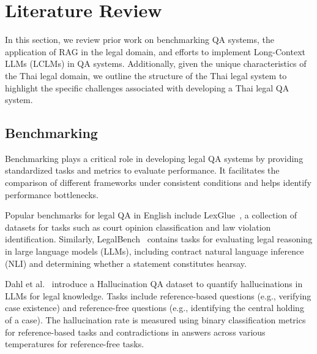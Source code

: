 \section{Literature Review}
\label{sec:lit_review}

In this section, we review prior work on benchmarking QA systems, the application of RAG in the legal domain, and efforts to implement Long-Context LLMs (LCLMs) in QA systems. 
%
Additionally, given the unique characteristics of the Thai legal domain, we outline the structure of the Thai legal system to highlight the specific challenges associated with developing a Thai legal QA system.

\subsection{Benchmarking}
\label{subsec: benchmarking}

Benchmarking plays a critical role in developing legal QA systems by providing standardized tasks and metrics to evaluate performance. 
%
It facilitates the comparison of different frameworks under consistent conditions and helps identify performance bottlenecks.

Popular benchmarks for legal QA in English include LexGlue~\cite{lexglue}, a collection of datasets for tasks such as court opinion classification and law violation identification. 
%
Similarly, LegalBench~\cite{legalbench} contains tasks for evaluating legal reasoning in large language models (LLMs), including contract natural language inference (NLI) and determining whether a statement constitutes hearsay.

Dahl et al.~\cite{Dahl_2024} introduce a Hallucination QA dataset to quantify hallucinations in LLMs for legal knowledge. 
%
Tasks include reference-based questions (e.g., verifying case existence) and reference-free questions (e.g., identifying the central holding of a case). 
%
The hallucination rate is measured using binary classification metrics for reference-based tasks and contradictions in answers across various temperatures for reference-free tasks.

